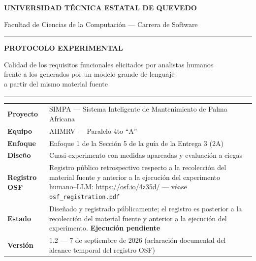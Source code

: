 \documentclass[11pt,a4paper]{article}
\newcommand{\id}[1]{\texttt{#1}}
\begin{document}
\begin{center}
{\large\bfseries UNIVERSIDAD TÉCNICA ESTATAL DE QUEVEDO\par}
{\normalsize Facultad de Ciencias de la Computación --- Carrera de Software\par}
\vspace{0.5cm}
\rule{\textwidth}{1pt}\par
\vspace{0.3cm}
{\LARGE\bfseries\color{uteqverde} PROTOCOLO EXPERIMENTAL\par}
\vspace{0.25cm}
{\large Calidad de los requisitos funcionales elicitados por analistas humanos\\
frente a los generados por un modelo grande de lenguaje\\
a partir del mismo material fuente\par}
\vspace{0.3cm}
\rule{\textwidth}{1pt}\par
\end{center}

\vspace{0.3cm}
\begin{longtable}{|L{4.0cm}|L{10.8cm}|}
\hline
{}\\
\hline
\textbf{Proyecto} & SIMPA --- Sistema Inteligente de Mantenimiento de Palma Africana \\ \hline
\textbf{Equipo} & AHMRV --- Paralelo 4to ``A'' \\ \hline
\textbf{Enfoque} & Enfoque 1 de la Sección 5 de la guía de la Entrega 3 (2A) \\ \hline
\textbf{Diseño} & Cuasi-experimento con medidas apareadas y evaluación a ciegas \\ \hline
\textbf{Registro OSF} & Registro público retrospectivo respecto a la recolección del material fuente y anterior a la ejecución del experimento humano--LLM: \url{https://osf.io/4z35d/} --- véase \id{osf\_registration.pdf} \\ \hline
\textbf{Estado} & Diseñado y registrado públicamente; el registro es posterior a la recolección del material fuente y anterior a la ejecución del experimento. \textbf{Ejecución pendiente} \\ \hline
\textbf{Versión} & 1.2 --- 7 de septiembre de 2026 (aclaración documental del alcance temporal del registro OSF) \\ \hline
\end{longtable}
\end{document}
